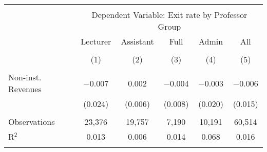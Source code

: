 
\begin{tabular}{@{\extracolsep{5pt}}lccccc} 
\\[-1.8ex]\hline 
\hline \\[-1.8ex] 
 & \multicolumn{5}{c}{Dependent Variable: Exit rate by Professor Group} \\ 
\cline{2-6} 
 & Lecturer & Assistant & Full & Admin & All \\ 
\\[-1.8ex] & (1) & (2) & (3) & (4) & (5)\\ 
\hline \\[-1.8ex] 
 Non-inst. Revenues & $-$0.007 & 0.002 & $-$0.004 & $-$0.003 & $-$0.006 \\ 
  & (0.024) & (0.006) & (0.008) & (0.020) & (0.015) \\ 
 \hline \\[-1.8ex] 
Observations & 23,376 & 19,757 & 7,190 & 10,191 & 60,514 \\ 
R$^{2}$ & 0.013 & 0.006 & 0.014 & 0.068 & 0.016 \\ 
\hline 
\hline \\[-1.8ex] 
\end{tabular} 
